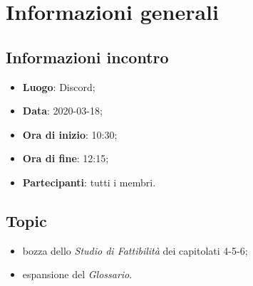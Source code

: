\section{Informazioni generali}
\subsection{Informazioni incontro}
\begin{itemize}
\item \textbf{Luogo}: Discord;
\item \textbf{Data}: 2020-03-18;
\item \textbf{Ora di inizio}: 10:30;
\item \textbf{Ora di fine}: 12:15;
\item \textbf{Partecipanti}: tutti i membri.
\end{itemize}

\subsection{Topic}
\begin{itemize}
\item bozza dello \textit{Studio di Fattibilità} dei capitolati 4-5-6;
\item espansione del \textit{Glossario}.
\end{itemize}